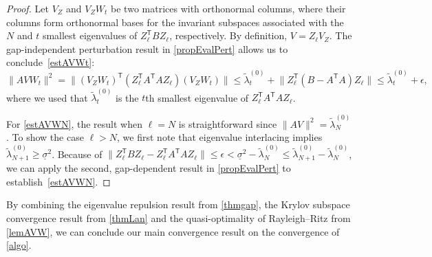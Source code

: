 \documentclass{siamart190516}
\newcommand{\Ttran}{\mathsf{T}}
\providecommand{\norm}[1]{\lVert#1\rVert}
\begin{document}
\begin{proof}
    Let $V_{Z}$ and $V_{Z}W_{t}$ be two matrices with orthonormal columns, where their columns form orthonormal bases for the invariant subspaces associated with the $N$ and $t$ smallest eigenvalues of $Z_{\ell}^{\Ttran}BZ_{\ell}$, respectively. By definition, $V=Z_{\ell}V_{Z}$.
The gap-independent perturbation result in \cref{propEvalPert} allows us to conclude~\eqref{estAVWt}:
\begin{equation*}
    \norm{AVW_{t}}^{2}=\norm{(V_{Z}W_{t})^{\Ttran}( Z_\ell^{\Ttran} A^{\Ttran} A Z_\ell ) (V_{Z}W_{t}) } \le \tilde \lambda_t^{(0)} + \norm{Z_\ell^{\Ttran} (B-A^{\Ttran} A) Z_\ell} \le 
 \tilde \lambda_t^{(0)} + \epsilon,
\end{equation*}
where we used that $\tilde \lambda_t^{(0)}$ is the $t$th smallest eigenvalue of $Z_\ell^{\Ttran} A^{\Ttran} A Z_\ell$.

For \cref{estAVWN}, the result when $\ell=N$ is straightforward since $\norm{AV}^{2}=\tilde{\lambda}_{N}^{(0)}$. To show the case $\ell>N$,
we first note that eigenvalue interlacing implies
$\tilde \lambda_{N+1}^{(0)}\geq \underline{\sigma}^{2}$.
Because of $\| Z_\ell^{\Ttran} B Z_\ell -  Z_\ell^{\Ttran} A^{\Ttran} A Z_\ell\| \le \epsilon < \underline{\sigma}^{2}-\tilde \lambda_N^{(0)} \le \tilde \lambda_{N+1}^{(0)} - \tilde \lambda_{N}^{(0)}$, 
we can apply the second, gap-dependent result in \cref{propEvalPert} to establish~\eqref{estAVWN}.
\end{proof}

By combining the eigenvalue repulsion result from \cref{thmgap}, the Krylov subspace convergence result from \cref{thmLan} and the quasi-optimality of Rayleigh--Ritz from \cref{lemAVW},
we can conclude our main convergence result on the convergence of \cref{algo}.
\end{document}
